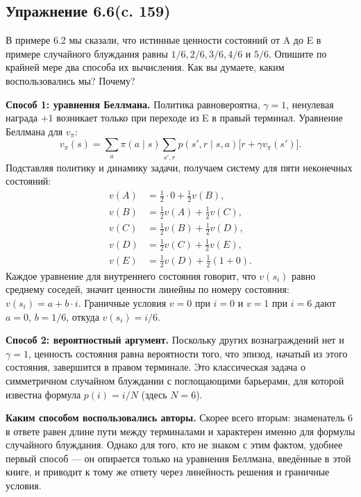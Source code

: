 \subsection{Упражнение 6.6(c. 159)}
В примере 6.2 мы сказали, что истинные ценности состояний от A до E в примере случайного блуждания равны $1/6, 2/6, 3/6, 4/6$ и $5/6$. Опишите по крайней мере два способа их вычисления. Как вы думаете, каким воспользовались мы? Почему?
\begin{solution}
    \textbf{Способ 1: уравнения Беллмана.} Политика равновероятна, $\gamma = 1$, ненулевая награда $+1$ возникает только при переходе из E в правый терминал. Уравнение Беллмана для $v_\pi$:
    \[
    v_\pi(s) = \sum_{a} \pi(a \mid s) \sum_{s', r} p(s', r \mid s, a)\bigl[r + \gamma v_\pi(s')\bigr].
    \]
    Подставляя политику и динамику задачи, получаем систему для пяти неконечных состояний:
    \begin{align*}
        v(A) &= \tfrac{1}{2} \cdot 0 + \tfrac{1}{2} v(B), \\
        v(B) &= \tfrac{1}{2} v(A) + \tfrac{1}{2} v(C), \\
        v(C) &= \tfrac{1}{2} v(B) + \tfrac{1}{2} v(D), \\
        v(D) &= \tfrac{1}{2} v(C) + \tfrac{1}{2} v(E), \\
        v(E) &= \tfrac{1}{2} v(D) + \tfrac{1}{2}(1 + 0).
    \end{align*}
    Каждое уравнение для внутреннего состояния говорит, что $v(s_i)$ равно среднему соседей, значит ценности линейны по номеру состояния: $v(s_i) = a + b \cdot i$. Граничные условия $v = 0$ при $i = 0$ и $v = 1$ при $i = 6$ дают $a = 0$, $b = 1/6$, откуда $v(s_i) = i/6$.

    \textbf{Способ 2: вероятностный аргумент.} Поскольку других вознаграждений нет и $\gamma = 1$, ценность состояния равна вероятности того, что эпизод, начатый из этого состояния, завершится в правом терминале. Это классическая задача о симметричном случайном блуждании с поглощающими барьерами, для которой известна формула $p(i) = i/N$ (здесь $N = 6$).

    \textbf{Каким способом воспользовались авторы.} Скорее всего вторым: знаменатель $6$ в ответе равен длине пути между терминалами и характерен именно для формулы случайного блуждания. Однако для того, кто не знаком с этим фактом, удобнее первый способ — он опирается только на уравнения Беллмана, введённые в этой книге, и приводит к тому же ответу через линейность решения и граничные условия.
\end{solution}

